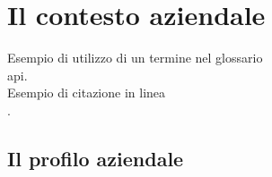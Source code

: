
\chapter{Il contesto aziendale}
\label{cap:introduzione}

\noindent Esempio di utilizzo di un termine nel glossario \\
\gls{api}. \\

\noindent Esempio di citazione in linea \\
\cite{site:agile-manifesto}. \\

\section{Il profilo aziendale}

